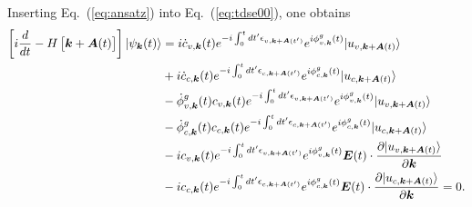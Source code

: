 Inserting Eq.~(\ref{eq:ansatz}) into Eq.~(\ref{eq:tdse00}), one obtains
\begin{align}
	\left [i\frac{d}{dt}-H\left [\boldsymbol k + \boldsymbol A(t) \right ] \right ]|\psi_{\boldsymbol k}(t) \rangle & =
	i \dot c_{v,\boldsymbol k}(t) e^{-i\int^t_0dt' \epsilon_{v,\boldsymbol k+ \boldsymbol A(t')}} e^{i\phi^g_{v,\boldsymbol k}(t)} |u_{v,\boldsymbol k+\boldsymbol A(t)}\rangle \nonumber                                                                                                                                                \\
	                                                                                              & + i\dot c_{c,\boldsymbol k}(t) e^{-i\int^t_0dt' \epsilon_{c,\boldsymbol k+ \boldsymbol A(t')}} e^{i\phi^g_{c,\boldsymbol k}(t)} |u_{c,\boldsymbol k+\boldsymbol A(t)}\rangle \nonumber                                               \\
	                                                                                              & - \dot \phi^g_{v,\boldsymbol k}(t) c_{v,\boldsymbol k}(t) e^{-i\int^t_0dt' \epsilon_{v,\boldsymbol k+ \boldsymbol A(t')}} e^{i\phi^g_{v,\boldsymbol k}(t)} |u_{v,\boldsymbol k+\boldsymbol A(t)}\rangle \nonumber                          \\
	                                                                                              & - \dot \phi^g_{c,\boldsymbol k}(t) c_{c,\boldsymbol k}(t) e^{-i\int^t_0dt' \epsilon_{c,\boldsymbol k+ \boldsymbol A(t')}} e^{i\phi^g_{c,\boldsymbol k}(t)} |u_{c,\boldsymbol k+\boldsymbol A(t)}\rangle \nonumber                          \\
	                                                                                              & - i c_{v,\boldsymbol k}(t) e^{-i\int^t_0dt' \epsilon_{v,\boldsymbol k+ \boldsymbol A(t')}} e^{i\phi^g_{v,\boldsymbol k}(t)} \boldsymbol E(t)\cdot \frac{\partial |u_{v,\boldsymbol k+\boldsymbol A(t)}\rangle}{\partial \boldsymbol k} \nonumber \\
	                                                                                              & - i c_{c,\boldsymbol k}(t) e^{-i\int^t_0dt' \epsilon_{c,\boldsymbol k+ \boldsymbol A(t')}} e^{i\phi^g_{c,\boldsymbol k}(t)} \boldsymbol E(t)\cdot \frac{\partial |u_{c,\boldsymbol k+\boldsymbol A(t)}\rangle}{\partial \boldsymbol k} = 0.
	\label{eq:tdse01}
\end{align}

